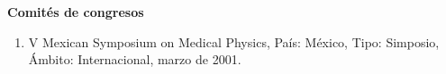 \textbf{Comités de congresos}

\begin{enumerate}
\item V Mexican Symposium on Medical Physics, País: México, Tipo: Simposio, Ámbito: Internacional, marzo de 2001.
\end{enumerate}

